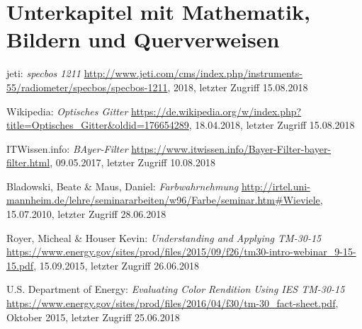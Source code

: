 \section{Unterkapitel mit Mathematik, Bildern und Querverweisen}






\listoffigures %
\listoftables %


\begin{thebibliography}{}

jeti:
\emph{\glqq specbos 1211\grqq}
\url{http://www.jeti.com/cms/index.php/instruments-55/radiometer/specbos/specbos-1211}, 2018, letzter Zugriff 15.08.2018

Wikipedia:
\emph{\glqq Optisches Gitter\grqq}
\url{https://de.wikipedia.org/w/index.php?title=Optisches_Gitter&oldid=176654289}, 18.04.2018, letzter Zugriff 15.08.2018

ITWissen.info:
\emph{\glqq BAyer-Filter\grqq}
\url{https://www.itwissen.info/Bayer-Filter-bayer-filter.html}, 09.05.2017, letzter Zugriff 10.08.2018

Bladowski, Beate \& Maus, Daniel:
\emph{\glqq Farbwahrnehmung\grqq}
\url{http://irtel.uni-mannheim.de/lehre/seminararbeiten/w96/Farbe/seminar.htm#Wieviele}, 15.07.2010, letzter Zugriff 28.06.2018

Royer, Micheal \& Houser Kevin:
\emph{\glqq Understanding and Applying TM-30-15\grqq}
\url{https://www.energy.gov/sites/prod/files/2015/09/f26/tm30-intro-webinar_9-15-15.pdf}, 15.09.2015, letzter Zugriff 26.06.2018

U.S. Department of Energy:
\emph{\glqq Evaluating Color Rendition Using IES TM-30-15\grqq}
\url{https://www.energy.gov/sites/prod/files/2016/04/f30/tm-30_fact-sheet.pdf}, Oktober 2015, letzter Zugriff 25.06.2018


\end{thebibliography}
